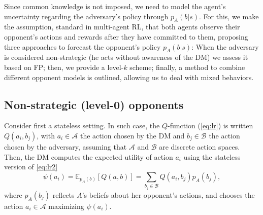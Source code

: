 Since common knowledge is not imposed,
we need to model the agent's uncertainty regarding the
adversary's policy through  $p_A (b | s)$.
 For this, we make the 
 assumption, standard in multi-agent RL, that both agents observe their opponent's actions and rewards
 after they have committed to them, proposing three approaches to forecast the opponent's policy $p_A (b | s)$:  %
When the adversary is considered non-strategic
(he acts without awareness of the DM) we assess it based 
on FP; then, we provide a level-$k$ scheme;
finally, a method to combine different opponent models
is outlined, allowing us to deal with mixed behaviors.

\subsection{Non-strategic (level-0) opponents}\label{sec:non}

Consider first a stateless setting. In such case, 
the $Q$-function (\ref{eq:lr}) is written
  $Q(a_i,b_j)$, with $a_i \in \mathcal{A}$ the action chosen by
 the DM and $b_j \in \mathcal{B}$ the action chosen by the adversary, assuming that $\mathcal{A}$ and $\mathcal{B}$ are discrete action spaces.
 Then, the DM  computes the expected utility of action $a_i$ using the stateless version of \eqref{eq:lr2}
\[ \psi(a_i) = \mathbb{E}_{p_A(b)} [Q(a,b)] = \sum_{b_j \in \mathcal{B}} Q(a_i, b_j) p_{A}(b_j), \]
where $p_A (b_j)$ reflects $A$'s beliefs about her opponent's actions,
 and chooses the action $a_i \in \mathcal{A}$
maximizing $\psi(a_i)$.
 
